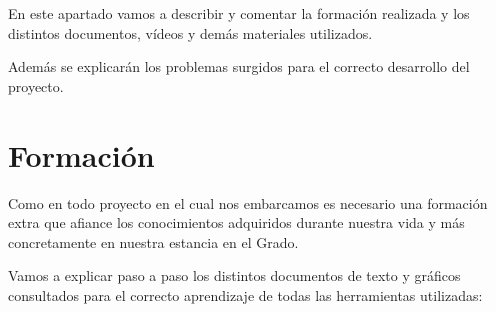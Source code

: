 

En este apartado vamos a describir y comentar la formación realizada y los distintos documentos, vídeos y demás materiales utilizados.

Además se explicarán los problemas surgidos para el correcto desarrollo del proyecto.


\section{Formación}

Como en todo proyecto en el cual nos embarcamos es necesario una formación extra que afiance los conocimientos adquiridos durante nuestra vida y más concretamente en nuestra estancia en el Grado.

Vamos a explicar paso a paso los distintos documentos de texto y gráficos consultados para el correcto aprendizaje de todas las herramientas utilizadas:

